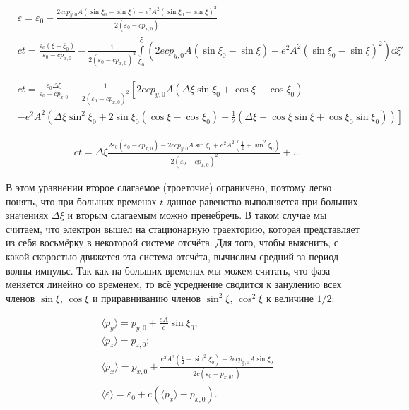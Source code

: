 \documentclass[10pt, a4paper]{article}
\begin{document}
\begin{align*}
	&\varepsilon = \varepsilon_0 - \frac{2ecp_{y,0}A \left( \sin\xi_0 - \sin\xi \right) - e^2 A^2 \left( \sin\xi_0 - \sin\xi \right)^2}{2\left( \varepsilon_0 - cp_{x,0} \right)}\\
	&ct = \frac{\varepsilon_0\left( \xi-\xi_0 \right)}{ \varepsilon_0 - cp_{x,0}}-\frac{1}{2\left( \varepsilon_0 - cp_{x,0} \right)^2}\int\limits_{\xi_0}^{\xi}\left( 2ecp_{y,0}A \left( \sin\xi_0 - \sin\xi \right) - e^2 A^2 \left( \sin\xi_0 - \sin\xi \right)^2  \right)\dd\xi'
\end{align*}

\begin{align*}
	&ct = \frac{\varepsilon_0\Delta\xi}{ \varepsilon_0 - cp_{x,0}}-\frac{1}{2\left( \varepsilon_0 - cp_{x,0} \right)^2}\left[ 2ecp_{y,0}A\left( \Delta\xi\sin\xi_0 + \cos\xi - \cos\xi_0 \right) - \right. \\
	&\left. - e^2A^2\left( \Delta\xi\sin^2\xi_0 + 2\sin\xi_0 \left( \cos\xi - \cos\xi_0 \right) + \frac{1}{2}\left( \Delta\xi - \cos\xi\sin\xi + \cos\xi_0\sin\xi_0 \right) \right) \right]
\end{align*}

\begin{align*}
	&ct = \Delta\xi \frac{2\varepsilon_0\left( \varepsilon_0 - cp_{x,0} \right) - 2ecp_{y,0}A \sin\xi_0 + e^2A^2\left( \frac{1}{2} + \sin^2\xi_0  \right)}{2\left( \varepsilon_0 - cp_{x,0} \right)^2} + \dots
\end{align*}

В этом уравнении второе слагаемое (троеточие) ограничено, поэтому легко понять, что при больших временах $t$ данное равенство выполняется при больших значениях $\Delta\xi$ и вторым слагаемым можно пренебречь. В таком случае мы считаем, что электрон вышел на стационарную траекторию, которая представляет из себя восьмёрку в некоторой системе отсчёта. Для того, чтобы выяснить, с какой скоростью движется эта система отсчёта, вычислим средний за период волны импульс. Так как на больших временах мы можем считать, что фаза меняется линейно со временем, то всё усреднение сводится к занулению всех членов $\sin\xi$, $\cos\xi$ и приравниванию членов $\sin^2\xi$, $\cos^2\xi$ к величине $1/2$:

\begin{align*}
	&\langle p_y \rangle = p_{y, 0} + \frac{eA}{c}\sin\xi_0; \\
	&\langle p_z \rangle = p_{z, 0}; \\
	&\langle p_x \rangle = p_{x, 0} + \frac{e^2A^2\left( \frac{1}{2} + \sin^2\xi_0 \right) - 2ecp_{y,0}A\sin\xi_0}{2c\left( \varepsilon_0 - p_{x, 0}; \right)} \\
	&\langle \varepsilon \rangle = \varepsilon_0 + c\left( \langle p_x \rangle - p_{x, 0} \right).
\end{align*}
\end{document}
